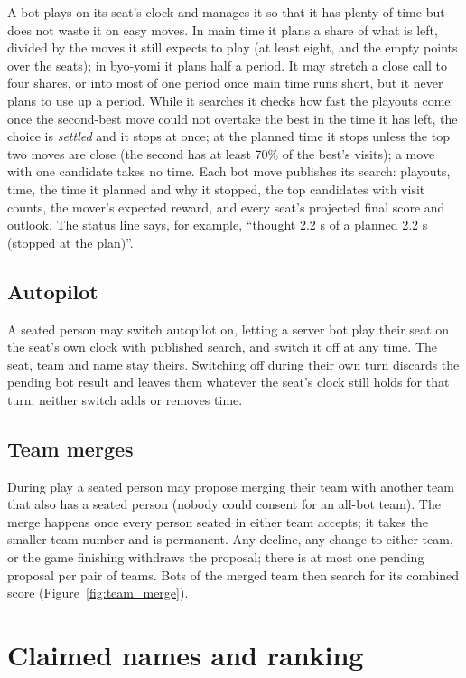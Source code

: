\documentclass[11pt,oneside]{book}
\begin{document}
A bot plays on its seat's clock and manages it so that it has plenty of time
but does not waste it on easy moves. In main time it plans a share of what is
left, divided by the moves it still expects to play (at least eight, and the
empty points over the seats); in byo-yomi it plans half a period. It may stretch
a close call to four shares, or into most of one period once main time runs
short, but it never plans to use up a period. While it searches it checks how
fast the playouts come: once the second-best move could not overtake the best
in the time it has left, the choice is \emph{settled} and it stops at once; at
the planned time it stops unless the top two moves are close (the second has at
least 70\% of the best's visits); a move with one candidate takes no time.
Each bot move publishes its search: playouts, time, the time it planned and why
it stopped, the top candidates with visit counts, the mover's expected reward,
and every seat's projected final score and outlook. The status line says, for
example, ``thought 2.2 s of a planned 2.2 s (stopped at the plan)''.

\section{Autopilot}
A seated person may switch autopilot on, letting a server bot play their seat
on the seat's own clock with published search, and switch it off at any time.
The seat, team and name stay theirs. Switching off during their own turn
discards the pending bot result and leaves them whatever the seat's clock still
holds for that turn; neither switch adds or removes time.

\section{Team merges}
During play a seated person may propose merging their team with another team
that also has a seated person (nobody could consent for an all-bot team). The
merge happens once every person seated in either team accepts; it takes the
smaller team number and is permanent. Any decline, any change to either team,
or the game finishing withdraws the proposal; there is at most one pending
proposal per pair of teams. Bots of the merged team then search for its
combined score (Figure~\ref{fig:team_merge}).

\chapter{Claimed names and ranking}
\label{ch:claims}
\end{document}
